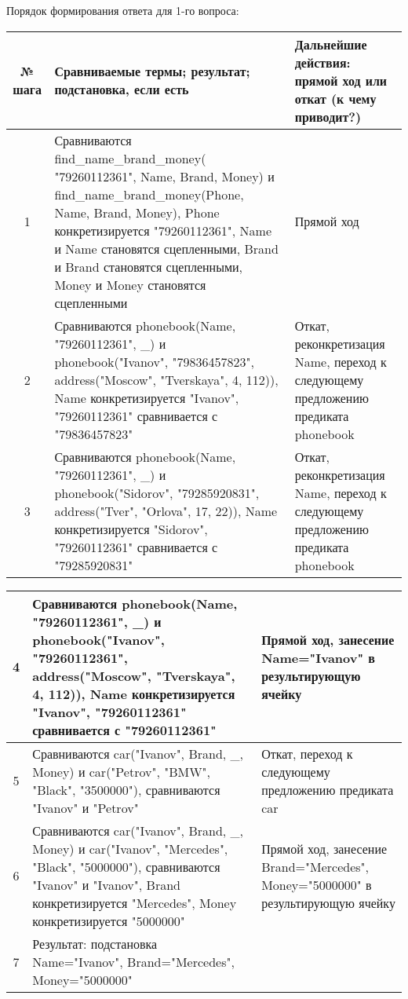 \documentclass[a4paper,12pt]{article}
\begin{document}
Порядок формирования ответа для 1-го вопроса:
\begin{table}[ht!] 
	\begin{tabularx}{\linewidth}{|c|>{\centering}X|>{\centering}X|}
		\hline
		№ шага & Сравниваемые термы; результат; подстановка, если есть & Дальнейшие действия: прямой ход или откат (к чему приводит?)\tabularnewline
		\hline
		1 & Сравниваются find\_name\_brand\_money( "79260112361"{}, Name, Brand, Money) и find\_name\_brand\_money(Phone, Name, Brand, Money), Phone конкретизируется "79260112361"{}, Name и Name становятся сцепленными, Brand и Brand становятся сцепленными, Money и Money становятся сцепленными & Прямой ход \tabularnewline
		\hline
		2 & Сравниваются phonebook(Name, "79260112361"{}, \_) и phonebook("Ivanov"{}, "79836457823"{}, address("Moscow"{}, "Tverskaya"{}, 4, 112)), Name конкретизируется "Ivanov"{}, "79260112361" сравнивается с "79836457823" & Откат, реконкретизация Name, переход к следующему предложению предиката phonebook \tabularnewline
		\hline
		3 & Сравниваются phonebook(Name, "79260112361"{}, \_) и phonebook("Sidorov"{}, "79285920831"{}, address("Tver"{}, "Orlova"{}, 17, 22)), Name конкретизируется "Sidorov"{}, "79260112361" сравнивается с "79285920831" & Откат, реконкретизация Name, переход к следующему предложению предиката phonebook \tabularnewline
		\hline
	\end{tabularx}
\end{table}
\newpage
\begin{table}[ht!] 
	\begin{tabularx}{\linewidth}{|c|>{\centering}X|>{\centering}X|}
		\hline
		4 & Сравниваются phonebook(Name, "79260112361"{}, \_) и phonebook("Ivanov"{}, "79260112361"{}, address("Moscow"{}, "Tverskaya"{}, 4, 112)), Name конкретизируется "Ivanov"{}, "79260112361" сравнивается с "79260112361" & Прямой ход, занесение Name="Ivanov" в результирующую ячейку \tabularnewline
		\hline
		5 & Сравниваются car("Ivanov"{}, Brand, \_, Money) и car("Petrov"{}, "BMW"{}, "Black"{}, "3500000"), сравниваются "Ivanov" и "Petrov" & Откат, переход к следующему предложению предиката car \tabularnewline
		\hline
		6 & Сравниваются car("Ivanov"{}, Brand, \_, Money) и car("Ivanov"{}, "Mercedes"{}, "Black"{}, "5000000"), сравниваются "Ivanov" и "Ivanov"{}, Brand конкретизируется "Mercedes"{}, Money конкретизируется "5000000" & Прямой ход, занесение Brand="Mercedes"{}, Money="5000000" в результирующую ячейку \tabularnewline
		\hline
		7 & Результат: подстановка Name="Ivanov"{}, Brand="Mercedes"{}, Money="5000000" &  \tabularnewline
		\hline
	\end{tabularx}
\end{table}	
\end{document}
